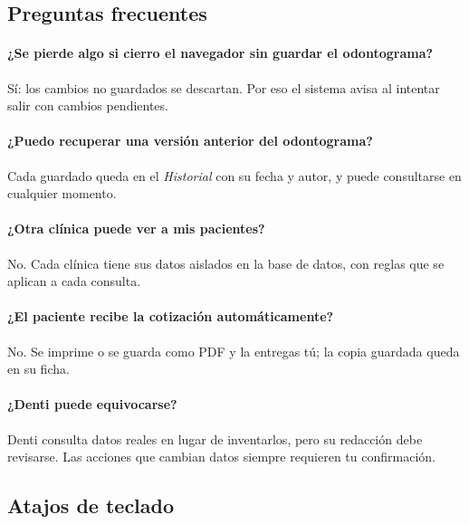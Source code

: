 \documentclass[11pt]{article}
\begin{document}
\subsection{Preguntas frecuentes}

\paragraph{¿Se pierde algo si cierro el navegador sin guardar el odontograma?} Sí: los cambios no guardados se descartan. Por eso el sistema avisa al intentar salir con cambios pendientes.

\paragraph{¿Puedo recuperar una versión anterior del odontograma?} Cada guardado queda en el \textit{Historial} con su fecha y autor, y puede consultarse en cualquier momento.

\paragraph{¿Otra clínica puede ver a mis pacientes?} No. Cada clínica tiene sus datos aislados en la base de datos, con reglas que se aplican a cada consulta.

\paragraph{¿El paciente recibe la cotización automáticamente?} No. Se imprime o se guarda como PDF y la entregas tú; la copia guardada queda en su ficha.

\paragraph{¿Denti puede equivocarse?} Denti consulta datos reales en lugar de inventarlos, pero su redacción debe revisarse. Las acciones que cambian datos siempre requieren tu confirmación.

\label{sec:referencia}

\subsection{Atajos de teclado}
\end{document}
